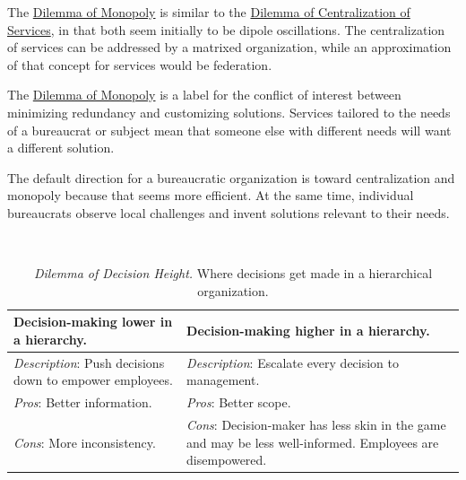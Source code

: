 The \hyperref[table:dilemma-org-market-vs-monopoly]{Dilemma of Monopoly} is similar to the \hyperref[table:dilemma-org-central-vs-distributed]{Dilemma of Centralization of Services}, in that both seem initially to be dipole oscillations. The centralization of services can be addressed by a matrixed organization, while an approximation of that concept for services would be federation. 

The \hyperref[table:dilemma-org-market-vs-monopoly]{Dilemma of Monopoly} is a label for the conflict of interest between minimizing redundancy and customizing solutions. Services tailored to the needs of a bureaucrat or subject mean that someone else with different needs will want a different solution. 


The default direction for a bureaucratic organization is toward centralization and monopoly because that seems more efficient. At the same time, individual bureaucrats observe local challenges and invent solutions relevant to their needs.


\ \\

\begin{center}
\begin{table}[H] %
\begin{tabular}{ | m{\dilemmatablewidth}| m{\dilemmatablewidth} | } 
  \hline
  \textbf{Decision-making lower in a hierarchy.} &
  \textbf{Decision-making higher in a hierarchy.} \\
  \hline
  \textit{Description}: Push decisions down to empower employees. &
  \textit{Description}: Escalate every decision to management. \\  
  \hline
  \textit{Pros}: Better information. &
  \textit{Pros}: Better scope. \\
  \hline
  \textit{Cons}: More inconsistency. & 
  \textit{Cons}: Decision-maker has less skin in the game and may be less well-informed. Employees are disempowered. \\
  \hline
\end{tabular}
\caption{
\textit{Dilemma of Decision Height.}
Where decisions get made in a hierarchical organization.
}
\label{table:dilemma-org-decisions-low-vs-high}
\end{table}
\end{center}

